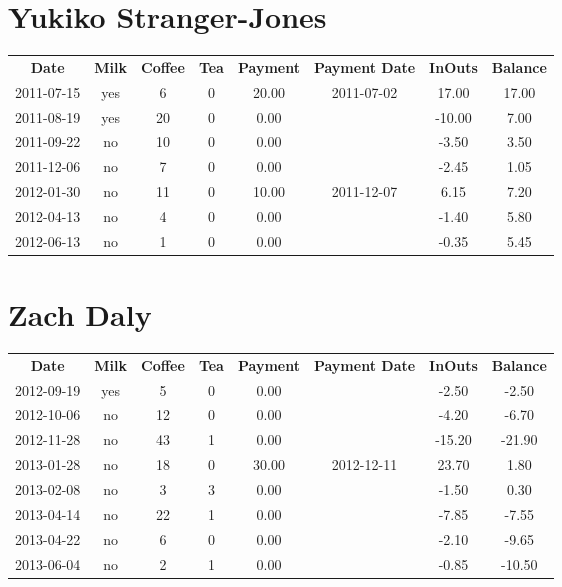 \section{Yukiko Stranger-Jones}

\begin{center}
\begin{tabular}{cccccccc}
\textbf{Date} & \textbf{Milk} & \textbf{Coffee} & \textbf{Tea} & \textbf{Payment} & \textbf{Payment Date} & \textbf{InOuts} & \textbf{Balance} \\
2011-07-15 & yes &  6 & 0 & 20.00 & 2011-07-02 &  17.00 & 17.00\\ 
2011-08-19 & yes & 20 & 0 &  0.00 &  & -10.00 &  7.00\\ 
2011-09-22 & no & 10 & 0 &  0.00 &  &  -3.50 &  3.50\\ 
2011-12-06 & no &  7 & 0 &  0.00 &  &  -2.45 &  1.05\\ 
2012-01-30 & no & 11 & 0 & 10.00 & 2011-12-07 &   6.15 &  7.20\\ 
2012-04-13 & no &  4 & 0 &  0.00 &  &  -1.40 &  5.80\\ 
2012-06-13 & no &  1 & 0 &  0.00 &  &  -0.35 &  5.45
\end{tabular}
\end{center}

\section{Zach Daly}

\begin{center}
\begin{tabular}{cccccccc}
\textbf{Date} & \textbf{Milk} & \textbf{Coffee} & \textbf{Tea} & \textbf{Payment} & \textbf{Payment Date} & \textbf{InOuts} & \textbf{Balance} \\
2012-09-19 & yes &  5 & 0 &  0.00 &  &  -2.50 &  -2.50\\ 
2012-10-06 & no & 12 & 0 &  0.00 &  &  -4.20 &  -6.70\\ 
2012-11-28 & no & 43 & 1 &  0.00 &  & -15.20 & -21.90\\ 
2013-01-28 & no & 18 & 0 & 30.00 & 2012-12-11 &  23.70 &   1.80\\ 
2013-02-08 & no &  3 & 3 &  0.00 &  &  -1.50 &   0.30\\ 
2013-04-14 & no & 22 & 1 &  0.00 &  &  -7.85 &  -7.55\\ 
2013-04-22 & no &  6 & 0 &  0.00 &  &  -2.10 &  -9.65\\ 
2013-06-04 & no &  2 & 1 &  0.00 &  &  -0.85 & -10.50
\end{tabular}
\end{center}
